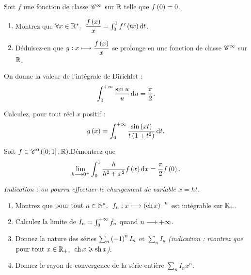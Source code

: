 \begin{exoss}
Soit \(f\) une fonction de classe \(\mathscr{C}^{\infty}\) sur \(\mathbb{R}\) telle que \(f\left(0\right)=0\).

\begin{enumerate}
    \item Montrez que \(\quantifs{\forall x\in\Rs}\dfrac{f\paren{x}}{x}=\int_0^1f\prim\paren{tx}\odif{t}\). \\
    \item Déduisez-en que \(g:x\longmapsto\dfrac{f\left(x\right)}{x}\) se prolonge en une fonction de classe \(\mathscr{C}^{\infty}\) sur \(\mathbb{R}\).
\end{enumerate}
\end{exoss}

\begin{exoss}
On donne la valeur de l'intégrale de Dirichlet : \[\int_0^{\pinf}\dfrac{\sin u}{u}\odif{u}=\dfrac{\pi}{2}.\]

Calculez, pour tout réel \(x\) positif : \[g\paren{x}=\int_0^{\pinf}\dfrac{\sin\paren{xt}}{t\paren{1+t^2}}\odif{t}.\]
\end{exoss}

\begin{exoss}
Soit \(f\in\mathscr{C}^{0}\left(\left[0;1\right],\mathbb{R}\right)\).Démontrez que \[\lim_{h\to0^+}\int_0^1\dfrac{h}{h^2+x^2}f\paren{x}\odif{x}=\dfrac{\pi}{2}f\paren{0}.\]

\textit{Indication : on pourra effectuer le changement de variable \(x=ht\).}
\end{exoss}

\begin{exo}
\begin{enumerate}
    \item Montrez que \(\quantifs{\tpt n\in\Ns}f_n:x\mapsto\paren{\ch x}^{-n}\) est intégrable sur \(\mathbb{R}_+\). \\
    \item Calculez la limite de \(I_n=\int_0^{+\infty}f_n\) quand \(n\longrightarrow+\infty\). \\
    \item Donnez la nature des séries \(\sum_n\left(-1\right)^nI_n\) et \(\sum_nI_n\) \textit{(indication : montrez que \(\quantifs{\tpt x\in\Rp}\ch x\geq\sh x\)).} \\
    \item Donnez le rayon de convergence de la série entière \(\sum_nI_nx^n\).
\end{enumerate}
\end{exo}

